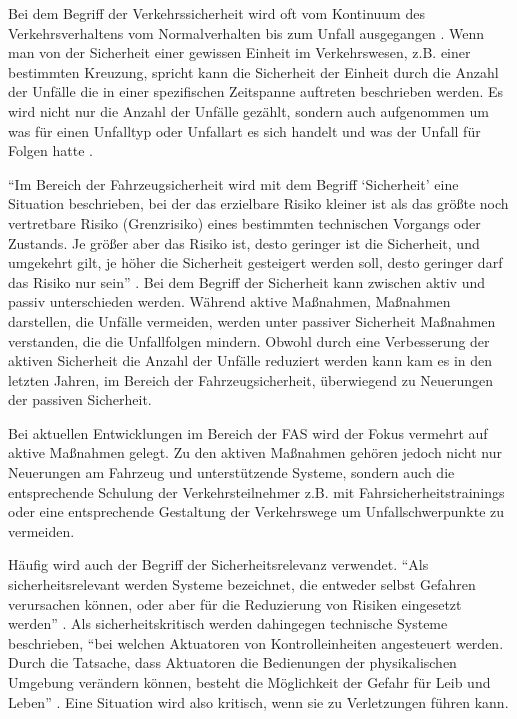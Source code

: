 Bei dem Begriff der Verkehrssicherheit wird oft vom Kontinuum des Verkehrsverhaltens vom Normalverhalten bis zum Unfall ausgegangen \parencite[S. 9]{Hoffmann.26.04.2013}. Wenn man von der Sicherheit einer gewissen Einheit im Verkehrswesen, z.B. einer bestimmten Kreuzung, spricht kann die Sicherheit der Einheit durch die Anzahl der Unfälle die in einer spezifischen Zeitspanne auftreten beschrieben werden. Es wird nicht nur die Anzahl der Unfälle gezählt, sondern auch aufgenommen um was für einen Unfalltyp oder Unfallart es sich handelt und was der Unfall für Folgen hatte \parencite[S. 3]{Antoniou.21.06.2018}.

\enquote{Im Bereich der Fahrzeugsicherheit wird mit dem Begriff \enquote{Sicherheit} eine Situation beschrieben, bei der das erzielbare Risiko kleiner ist als das größte noch vertretbare Risiko (Grenzrisiko) eines bestimmten technischen Vorgangs oder Zustands. Je größer aber das Risiko ist, desto geringer ist die Sicherheit, und umgekehrt gilt, je höher die Sicherheit gesteigert werden soll, desto geringer darf das Risiko nur sein} \parencite[S. 743]{Burg.2017}. Bei dem Begriff der Sicherheit kann zwischen aktiv und passiv unterschieden werden. Während aktive Maßnahmen, Maßnahmen darstellen, die Unfälle vermeiden, werden unter passiver Sicherheit Maßnahmen verstanden, die die Unfallfolgen mindern. Obwohl durch eine Verbesserung der aktiven Sicherheit die Anzahl der Unfälle reduziert werden kann kam es in den letzten Jahren, im Bereich der Fahrzeugsicherheit, überwiegend zu Neuerungen der passiven Sicherheit.

Bei aktuellen Entwicklungen im Bereich der \ac{FAS} wird der Fokus vermehrt auf aktive Maßnahmen gelegt. Zu den aktiven Maßnahmen gehören jedoch nicht nur Neuerungen am Fahrzeug und unterstützende Systeme, sondern auch die entsprechende Schulung der Verkehrsteilnehmer z.B. mit Fahrsicherheitstrainings oder eine entsprechende Gestaltung der Verkehrswege um Unfallschwerpunkte zu vermeiden.

Häufig wird auch der Begriff der Sicherheitsrelevanz verwendet. \enquote{Als sicherheitsrelevant werden Systeme bezeichnet, die entweder selbst Gefahren verursachen können, oder aber für die Reduzierung von Risiken eingesetzt werden} \parencite[S. 44]{Hillenbrand.2012}. Als sicherheitskritisch werden dahingegen technische Systeme beschrieben, \enquote{bei welchen Aktuatoren von Kontrolleinheiten angesteuert werden. Durch die Tatsache, dass Aktuatoren die Bedienungen der physikalischen Umgebung verändern können, besteht die Möglichkeit der Gefahr für Leib und Leben} \parencite[S. 44]{Hillenbrand.2012}. Eine Situation wird also kritisch, wenn sie zu Verletzungen führen kann.

